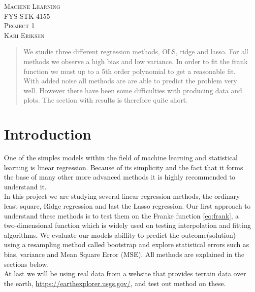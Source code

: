 \documentclass[a4paper,12pt, english]{article}
\begin{document}
\begin{titlepage}
\begin{center}
\textsc{\Large Machine Learning}\\[0.2cm]
\textsc{FYS-STK 4155}\\[1.0cm]
\textsc{\Large Project 1}\\[0.2cm]
\textsc{Kari Eriksen}\\[1.0cm]

\begin{abstract}
We studie three different regression methods, OLS, ridge and lasso. For all methods we observe a high bias and low variance. In order to fit the frank function we must up to a 5th order polynomial to get a reasonable fit. With added noise all methods are are able to predict the problem very well. However there have been some difficulties with producing data and plots. The section with results is therefore quite short.
\end{abstract}

\end{center}
\end{titlepage}

\section*{Introduction}

One of the simples models within the field of machine learning and statistical learning is linear regression. Because of its simplicity and the fact that it forms the base of many other more advanced methods it is highly recommended to understand it. \\ 
In this project we are studying several linear regression methods, the ordinary least square, Ridge regression and last the Lasso regression. Our first approach to understand these methods is to test them on the Franke function \ref{eq:frank}, a two-dimensional function which is widely used on testing interpolation and fitting algorithms. 
We evaluate our models abillity to predict the outcome(solution) using a resampling method called bootstrap and explore statistical errors such as bias, variance and Mean Square Error (MSE). All methods are explained in the sections below. \\
At last we will be using real data from a website that provides terrain data over the earth, \href{https://earthexplorer.usgs.gov/}{https://earthexplorer.usgs.gov/}, and test out method on these. 

 
\end{document}
